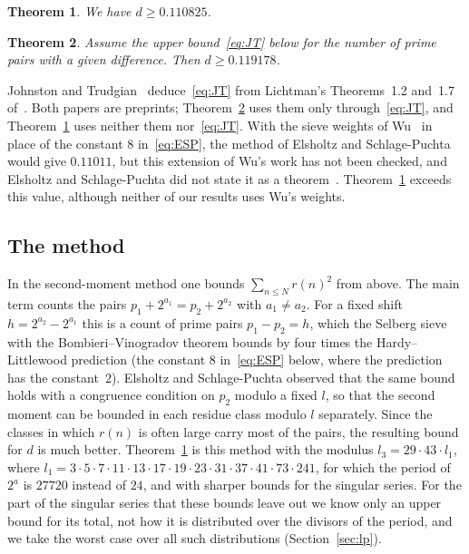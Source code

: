 \documentclass[11pt]{amsart}
\newtheorem{theorem}{Theorem}[section]
\theoremstyle{definition}
\theoremstyle{remark}
\numberwithin{equation}{section}
\newcommand{\DmainG}{0.119178}%
\newcommand{\DcertG}{0.1191789096}
\newcommand{\DuncondG}{0.110825}%
\newcommand{\DuncondGcert}{0.1108257388}
\newcommand{\PerG}{27720}
\newcommand{\Duncond}{\DuncondG}\newcommand{\Duncondcert}{\DuncondGcert}
\newcommand{\Dmain}{\DmainG}\newcommand{\Dcert}{\DcertG}
\newcommand{\Modulus}{3\cdot5\cdot7\cdot11\cdot13\cdot17\cdot19\cdot23\cdot31\cdot37\cdot41\cdot73\cdot241}
\begin{document}
\begin{theorem}\label{thm:uncond}
We have $d\ge\Duncond$.
\end{theorem}

\begin{theorem}\label{thm:main}
Assume the upper bound~\eqref{eq:JT} below for the number of prime pairs with a given difference. Then $d\ge\Dmain$.
\end{theorem}

Johnston and Trudgian~\cite[Proposition~2]{JT26} deduce~\eqref{eq:JT} from Lichtman's Theorems~1.2 and~1.7 of~\cite{Lic23}. Both papers are preprints; Theorem~\ref{thm:main} uses them only through~\eqref{eq:JT}, and Theorem~\ref{thm:uncond} uses neither them nor~\eqref{eq:JT}. With the sieve weights of Wu~\cite{Wu04} in place of the constant $8$ in~\eqref{eq:ESP}, the method of Elsholtz and Schlage-Puchta would give $0.11011$, but this extension of Wu's work has not been checked, and Elsholtz and Schlage-Puchta did not state it as a theorem~\cite[Section~4.2 and footnote~6]{JT26}. Theorem~\ref{thm:uncond} exceeds this value, although neither of our results uses Wu's weights.

\subsection*{The method}
In the second-moment method one bounds $\sum_{n\le N}r(n)^2$ from above. The main term counts the pairs $p_1+2^{a_1}=p_2+2^{a_2}$ with $a_1\ne a_2$. For a fixed shift $h=2^{a_2}-2^{a_1}$ this is a count of prime pairs $p_1-p_2=h$, which the Selberg sieve with the Bombieri--Vinogradov theorem bounds by four times the Hardy--Littlewood prediction (the constant $8$ in~\eqref{eq:ESP} below, where the prediction has the constant~$2$). Elsholtz and Schlage-Puchta observed that the same bound holds with a congruence condition on $p_2$ modulo a fixed $l$, so that the second moment can be bounded in each residue class modulo $l$ separately. Since the classes in which $r(n)$ is often large carry most of the pairs, the resulting bound for $d$ is much better. Theorem~\ref{thm:uncond} is this method with the modulus $l_3=29\cdot43\cdot l_1$, where $l_1=\Modulus$, for which the period of $2^a$ is $\PerG$ instead of $24$, and with sharper bounds for the singular series. For the part of the singular series that these bounds leave out we know only an upper bound for its total, not how it is distributed over the divisors of the period, and we take the worst case over all such distributions (Section~\ref{sec:lp}).
\end{document}
